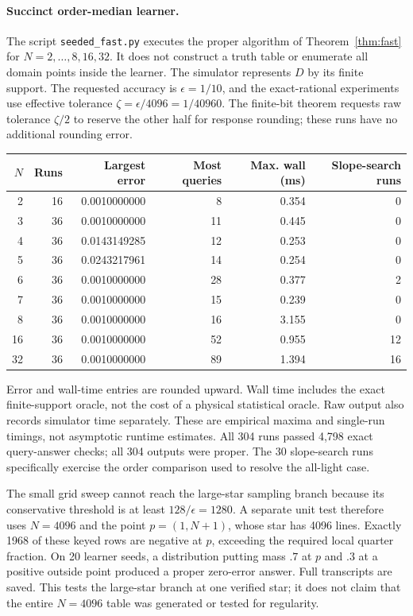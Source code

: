 \documentclass[11pt]{article}
\newcommand{\1}{\mathbf 1}
\begin{document}
\paragraph{Succinct order-median learner.}
The script \texttt{seeded\_fast.py} executes the proper algorithm of Theorem~\ref{thm:fast} for $N=2,\ldots,8,16,32$. It does not construct a truth table or enumerate all domain points inside the learner. The simulator represents $D$ by its finite support. The requested accuracy is $\epsilon=1/10$, and the exact-rational experiments use effective tolerance $\zeta=\epsilon/4096=1/40960$. The finite-bit theorem requests raw tolerance $\zeta/2$ to reserve the other half for response rounding; these runs have no additional rounding error.

\begin{center}\small
\begin{tabular}{rrrrrr}
\toprule
$N$&Runs&Largest error&Most queries&Max. wall (ms)&Slope-search runs\\
\midrule
2&16&0.0010000000&8&0.354&0\\
3&36&0.0010000000&11&0.445&0\\
4&36&0.0143149285&12&0.253&0\\
5&36&0.0243217961&14&0.254&0\\
6&36&0.0010000000&28&0.377&2\\
7&36&0.0010000000&15&0.239&0\\
8&36&0.0010000000&16&3.155&0\\
16&36&0.0010000000&52&0.955&12\\
32&36&0.0010000000&89&1.394&16\\
\bottomrule
\end{tabular}
\end{center}
Error and wall-time entries are rounded upward. Wall time includes the exact finite-support oracle, not the cost of a physical statistical oracle. Raw output also records simulator time separately. These are empirical maxima and single-run timings, not asymptotic runtime estimates. All 304 runs passed 4,798 exact query-answer checks; all 304 outputs were proper. The 30 slope-search runs specifically exercise the order comparison used to resolve the all-light case.

The small grid sweep cannot reach the large-star sampling branch because its conservative threshold is at least $128/\epsilon=1280$. A separate unit test therefore uses $N=4096$ and the point $p=(1,N+1)$, whose star has 4096 lines. Exactly 1968 of these keyed rows are negative at $p$, exceeding the required local quarter fraction. On 20 learner seeds, a distribution putting mass $.7$ at $p$ and $.3$ at a positive outside point produced a proper zero-error answer. Full transcripts are saved. This tests the large-star branch at one verified star; it does not claim that the entire $N=4096$ table was generated or tested for regularity.
\end{document}

